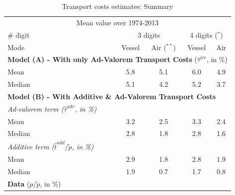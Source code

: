\documentclass[a4paper,11pt]{article}
\begin{document}
\begin{table}[htbp]
  \centering
  \footnotesize{
  \caption{Transport costs estimates: Summary \label{tab:summary_results}}
  \begin{center}
    \begin{tabular}{l|cc|cc}
      \hline \hline
    \multicolumn{5}{c}{Mean value over 1974-2013}   \\
    \# digit & \multicolumn{2}{c}{3 digits} & \multicolumn{2}{c}{4 digits ($^\ast$)} \\ \hline
    Mode  & Vessel & Air ($^{\ast \ast}$) & Vessel & Air \\ \hline
    \multicolumn{5}{l}{\textbf{Model (A) - With only Ad-Valorem Transport Costs} ($\widehat{\tau}^{ice}$, in \%)}  \\ \hline
    Mean  & 5.8 & 5.1 & 6.0 & 4.9 \\
    Median & 5.1 & 4.2 & 5.2 & 3.7 \\ \hline
    \multicolumn{5}{l}{\textbf{Model (B) - With Additive \& Ad-Valorem Transport Costs} } \\ \hline
   \textit{Ad-valorem term ($\widehat{\tau}^{adv}$, in \%)} & & & & \\ \hline
    Mean  & 3.2 & 2.5 & 3.3 & 2.4 \\
    Median & 2.8 & 1.8 & 2.8 & 1.6 \\ \hline
    \textit{Additive term ($\widehat{t}^{add}/\widetilde{p}$, in \%)}& & & &   \\ \hline
    Mean  & 2.9 & 1.8 & 2.8 & 1.9 \\
    Median & 1.9 & 0.7 & 1.7 & 0.8 \\ \hline
    \multicolumn{5}{l}{\textbf{Data} ($p/\widetilde{p}$, in \%) } \\ \hline

\end{tabular}
\end{center}}
\end{table}
\end{document}
